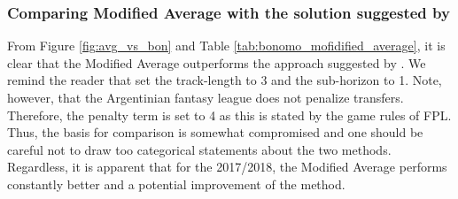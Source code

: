 \subsubsection{Comparing Modified Average with the solution suggested by \cite{Bonomo}}

From Figure \ref{fig:avg_vs_bon} and Table \ref{tab:bonomo_mofidified_average}, it is clear that the Modified Average outperforms the approach suggested by \cite{Bonomo}. We remind the reader that \cite{Bonomo} set the track-length to 3 and the sub-horizon to 1. Note, however, that the Argentinian fantasy league does not penalize transfers. Therefore, the penalty term is set to 4 as this is stated by the game rules of FPL. Thus, the basis for comparison is somewhat compromised and one should be careful not to draw too categorical statements about the two methods. Regardless, it is apparent that for the 2017/2018, the Modified Average performs constantly better and a potential improvement of the method.

